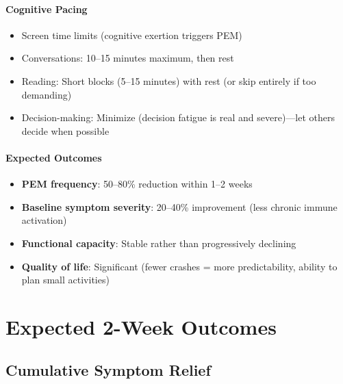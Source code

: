 \paragraph{Cognitive Pacing}

\begin{itemize}
    \item Screen time limits (cognitive exertion triggers PEM)
    \item Conversations: 10--15 minutes maximum, then rest
    \item Reading: Short blocks (5--15 minutes) with rest (or skip entirely if too demanding)
    \item Decision-making: Minimize (decision fatigue is real and severe)—let others decide when possible
\end{itemize}

\paragraph{Expected Outcomes}
\begin{itemize}
    \item \textbf{PEM frequency}: 50--80\% reduction within 1--2 weeks
    \item \textbf{Baseline symptom severity}: 20--40\% improvement (less chronic immune activation)
    \item \textbf{Functional capacity}: Stable rather than progressively declining
    \item \textbf{Quality of life}: Significant (fewer crashes = more predictability, ability to plan small activities)
\end{itemize}

\section{Expected 2-Week Outcomes}
\label{sec:two-week-outcomes}

\subsection{Cumulative Symptom Relief}

